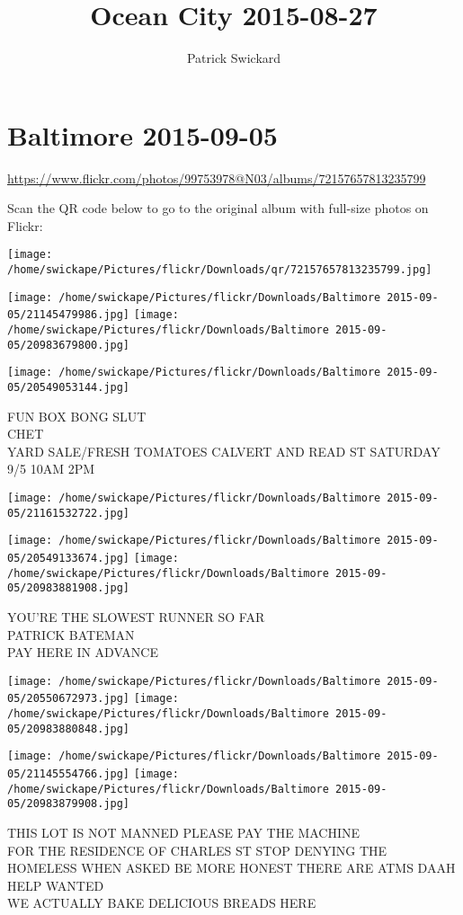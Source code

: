 \documentclass[10pt,letterpaper]{article}
\title{Ocean City 2015-08-27}
\author{Patrick Swickard}
\date{}
\begin{document}
\section*{Baltimore 2015-09-05}

\url{https://www.flickr.com/photos/99753978@N03/albums/72157657813235799}

Scan the QR code below to go to the original album with full-size photos on Flickr:

\texttt{[image: /home/swickape/Pictures/flickr/Downloads/qr/72157657813235799.jpg]}
\pagebreak

\texttt{[image: /home/swickape/Pictures/flickr/Downloads/Baltimore 2015-09-05/21145479986.jpg]}
\texttt{[image: /home/swickape/Pictures/flickr/Downloads/Baltimore 2015-09-05/20983679800.jpg]}

\texttt{[image: /home/swickape/Pictures/flickr/Downloads/Baltimore 2015-09-05/20549053144.jpg]}

FUN BOX BONG SLUT\\
CHET\\
YARD SALE/FRESH TOMATOES CALVERT AND READ ST SATURDAY 9/5 10AM 2PM
\pagebreak

\texttt{[image: /home/swickape/Pictures/flickr/Downloads/Baltimore 2015-09-05/21161532722.jpg]}

\vspace{0.25in}
\texttt{[image: /home/swickape/Pictures/flickr/Downloads/Baltimore 2015-09-05/20549133674.jpg]}
\texttt{[image: /home/swickape/Pictures/flickr/Downloads/Baltimore 2015-09-05/20983881908.jpg]}

YOU'RE THE SLOWEST RUNNER SO FAR\\
PATRICK BATEMAN\\
PAY HERE IN ADVANCE
\pagebreak

\texttt{[image: /home/swickape/Pictures/flickr/Downloads/Baltimore 2015-09-05/20550672973.jpg]}
\texttt{[image: /home/swickape/Pictures/flickr/Downloads/Baltimore 2015-09-05/20983880848.jpg]}

\texttt{[image: /home/swickape/Pictures/flickr/Downloads/Baltimore 2015-09-05/21145554766.jpg]}
\texttt{[image: /home/swickape/Pictures/flickr/Downloads/Baltimore 2015-09-05/20983879908.jpg]}

THIS LOT IS NOT MANNED PLEASE PAY THE MACHINE\\
FOR THE RESIDENCE OF CHARLES ST STOP DENYING THE HOMELESS WHEN ASKED BE MORE HONEST THERE ARE ATMS DAAH\\
HELP WANTED\\
WE ACTUALLY BAKE DELICIOUS BREADS HERE
\pagebreak
\end{document}
